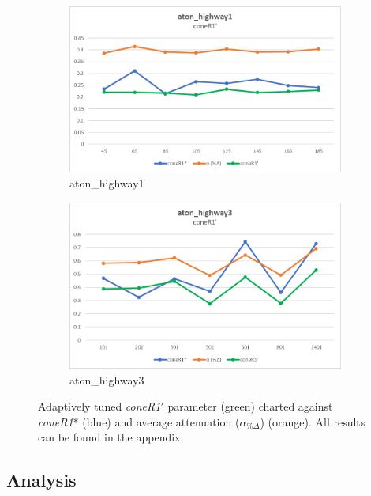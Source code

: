 \begin{figure}
  \centering
  \begin{subfigure}{.8\linewidth}
  \includegraphics[width=1\linewidth]{figures/model/highway1_calc_coneR1.jpg}
  \caption{aton\_highway1}
\end{subfigure}
\hfill
\begin{subfigure}{.8\linewidth}
  \includegraphics[width=1\linewidth]{figures/model/highway3_calc_coneR1.jpg}
  \caption{aton\_highway3}
\end{subfigure}

\caption{Adaptively tuned \textit{coneR1}$'$ parameter (green) charted against \textit{coneR1}* (blue) and average attenuation ($\alpha_{\%\Delta}$) (orange). All results can be found in the appendix.}
\label{fig:new_coneR1}
\end{figure}

\FloatBarrier
\subsection{Analysis}

